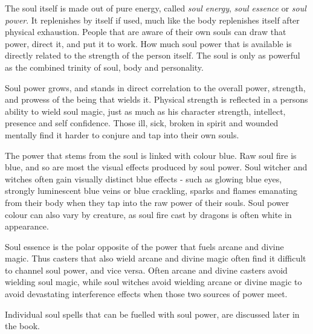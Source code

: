The soul itself is made out of pure energy, called \emph{soul energy},
\emph{soul essence} or \emph{soul power}. It replenishes by itself if used,
much like the body replenishes itself after physical exhaustion. People that
are aware of their own souls can draw that power, direct it, and put it to
work. How much soul power that is available is directly related to the
strength of the person itself. The soul is only as powerful as the combined
trinity of soul, body and personality.

Soul power grows, and stands in direct correlation to the overall power,
strength, and prowess of the being that wields it. Physical strength is
reflected in a persons ability to wield soul magic, just as much as his
character strength, intellect, presence and self confidence. Those ill, sick,
broken in spirit and wounded mentally find it harder to conjure and tap into
their own souls.

The power that stems from the soul is linked with colour blue. Raw soul fire
is blue, and so are most the visual effects produced by soul power. Soul
witcher and witches often gain visually distinct blue effects - such as
glowing blue eyes, strongly luminescent blue veins or blue crackling, sparks
and flames emanating from their body when they tap into the raw power of
their souls. Soul power colour can also vary by creature, as soul fire cast
by dragons is often white in appearance.

Soul essence is the polar opposite of the power that fuels arcane and divine
magic. Thus casters that also wield arcane and divine magic often find it
difficult to channel soul power, and vice versa. Often arcane and divine
casters avoid wielding soul magic, while soul witches avoid wielding arcane or
divine magic to avoid devastating interference effects when those two sources
of power meet.

Individual soul spells that can be fuelled with soul power, are discussed
later in the book.

